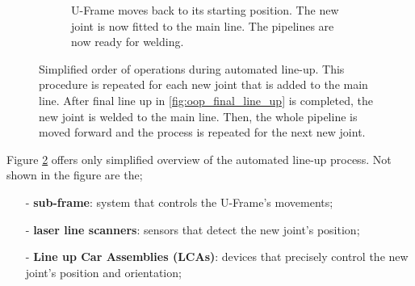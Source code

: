 \begin{figure}[H]
\begin{subfigure}{0.7\textwidth}
        \caption{U-Frame moves back to its starting position. The new joint is now fitted to the main line. The pipelines
            are now ready for welding.}
        \label{fig:oop_end}
    \end{subfigure}
    \caption{Simplified order of operations during automated line-up. This procedure is repeated for
        each new joint that is added to the main line. After final line up in \ref{fig:oop_final_line_up} is completed, the new joint
        is welded to the main line. Then, the whole pipeline is moved forward and the process is repeated for the next new joint.}
    \label{fig:oop_lua}
\end{figure}

Figure \ref{fig:oop_lua} offers only simplified overview of the automated line-up process.
Not shown in the figure are the;
\begin{enumerate}
    \item [-] \textbf{sub-frame}: system that controls the U-Frame's movements;
    \item [-] \textbf{laser line scanners}: sensors that detect the new joint's position;
    \item [-] \textbf{Line up Car Assemblies (LCAs)}: devices that precisely control the new joint's position and orientation;
\end{enumerate}

\newpage
